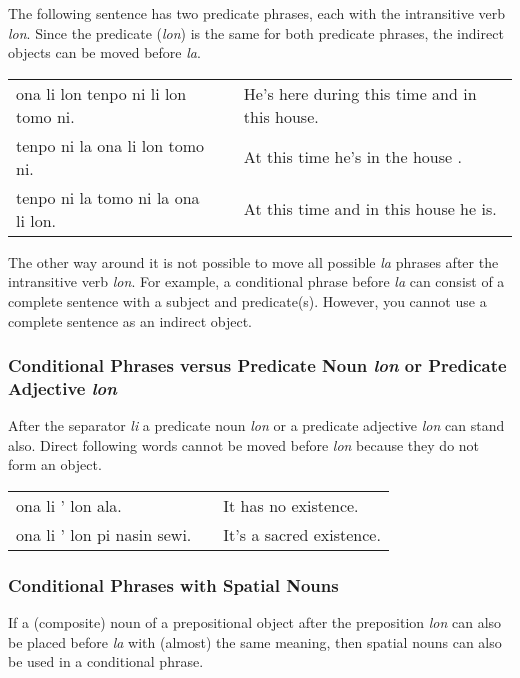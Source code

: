 The following sentence has two predicate phrases, each with the intransitive verb \textit{lon}.
Since the predicate (\textit{lon}) is the same for both predicate phrases, the indirect objects can be moved before \textit{la}.

\begin{supertabular}{p{5,5cm}|ll}
    ona li lon tenpo ni li lon tomo ni. &  & He's here during this time and in this house. \\
    tenpo ni la ona li lon tomo ni.     &  & At this time he's in the house .              \\
    tenpo ni la tomo ni la ona li lon.  &  & At this time and in this house he is.         \\
\end{supertabular}

The other way around it is not possible to move all possible \textit{la} phrases after the intransitive verb \textit{lon}.
For example, a conditional phrase before \textit{la} can consist of a complete sentence with a subject and predicate(s).
However, you cannot use a complete sentence as an indirect object.

\subsubsection*{Conditional Phrases versus Predicate Noun \textit{lon} or Predicate Adjective \textit{lon} }
After the separator \textit{li} a predicate noun \textit{lon} or a predicate adjective \textit{lon} can stand also.
Direct following words cannot be moved before \textit{lon} because they do not form an object.

\begin{supertabular}{p{5,5cm}|ll}
    ona li ' lon ala.           &  & It has no existence.     \\
    ona li ' lon pi nasin sewi. &  & It's a sacred existence. \\
\end{supertabular}

\subsubsection*{Conditional Phrases with Spatial Nouns}
If a (composite) noun of a prepositional object after the preposition \textit{lon} can also be placed before \textit{la} with (almost) the same meaning, then spatial nouns can also be used in a conditional phrase.


